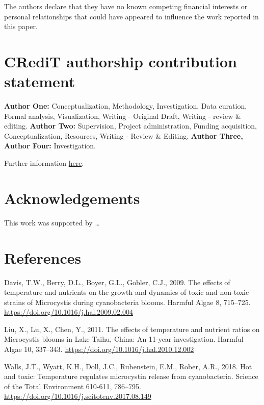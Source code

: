 \documentclass[review]{elsarticle} %
\begin{document}
The authors declare that they have no known competing financial
interests or personal relationships that could have appeared to
influence the work reported in this paper.

\section*{CRediT authorship contribution statement}\label{credit}

\textbf{Author One:} Conceptualization, Methodology, Investigation, Data
curation, Formal analysis, Visualization, Writing - Original Draft,
Writing - review \& editing. \textbf{Author Two:} Supervision, Project
administration, Funding acquisition, Conceptualization, Resources,
Writing - Review \& Editing. \textbf{Author Three, Author Four:}
Investigation.

Further information
\href{https://www.elsevier.com/authors/policies-and-guidelines/credit-author-statement}{here}.

\section*{Acknowledgements}\label{thanks}

This work was supported by \ldots{}

\newpage

\section*{References}\label{references}

\hypertarget{refs}{}
\hypertarget{ref-Davis2009}{}
Davis, T.W., Berry, D.L., Boyer, G.L., Gobler, C.J., 2009. The effects
of temperature and nutrients on the growth and dynamics of toxic and
non-toxic strains of Microcystis during cyanobacteria blooms. Harmful
Algae 8, 715--725. \url{https://doi.org/10.1016/j.hal.2009.02.004}

\hypertarget{ref-Liu2011a}{}
Liu, X., Lu, X., Chen, Y., 2011. The effects of temperature and nutrient
ratios on Microcystis blooms in Lake Taihu, China: An 11-year
investigation. Harmful Algae 10, 337--343.
\url{https://doi.org/10.1016/j.hal.2010.12.002}

\hypertarget{ref-Walls2018}{}
Walls, J.T., Wyatt, K.H., Doll, J.C., Rubenstein, E.M., Rober, A.R.,
2018. Hot and toxic: Temperature regulates microcystin release from
cyanobacteria. Science of the Total Environment 610-611, 786--795.
\url{https://doi.org/10.1016/j.scitotenv.2017.08.149}
\end{document}
